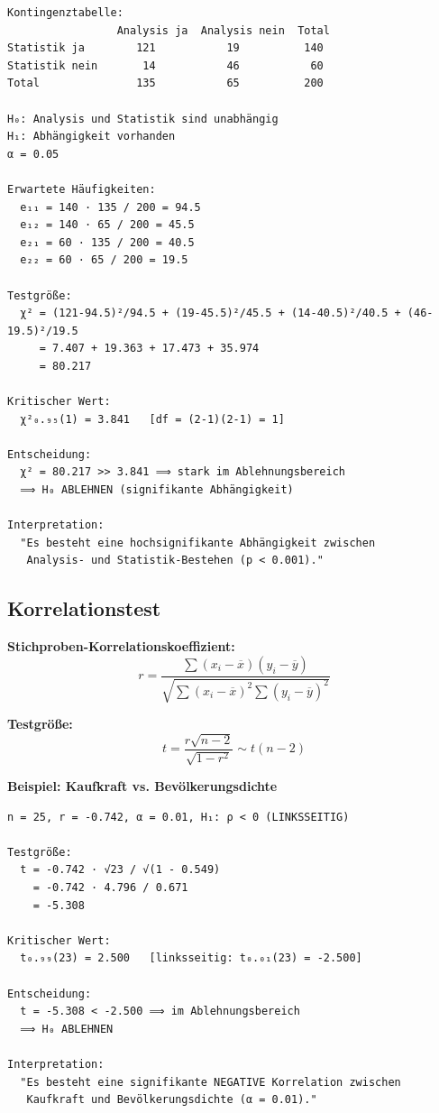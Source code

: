 \documentclass[12pt, a4paper, ngerman]{scrartcl}
\begin{document}
\begin{verbatim}
Kontingenztabelle:
                 Analysis ja  Analysis nein  Total
Statistik ja        121           19          140
Statistik nein       14           46           60
Total               135           65          200

H₀: Analysis und Statistik sind unabhängig
H₁: Abhängigkeit vorhanden
α = 0.05

Erwartete Häufigkeiten:
  e₁₁ = 140 · 135 / 200 = 94.5
  e₁₂ = 140 · 65 / 200 = 45.5
  e₂₁ = 60 · 135 / 200 = 40.5
  e₂₂ = 60 · 65 / 200 = 19.5

Testgröße:
  χ² = (121-94.5)²/94.5 + (19-45.5)²/45.5 + (14-40.5)²/40.5 + (46-19.5)²/19.5
     = 7.407 + 19.363 + 17.473 + 35.974
     = 80.217

Kritischer Wert:
  χ²₀.₉₅(1) = 3.841   [df = (2-1)(2-1) = 1]

Entscheidung:
  χ² = 80.217 >> 3.841 ⟹ stark im Ablehnungsbereich
  ⟹ H₀ ABLEHNEN (signifikante Abhängigkeit)

Interpretation:
  "Es besteht eine hochsignifikante Abhängigkeit zwischen
   Analysis- und Statistik-Bestehen (p < 0.001)."
\end{verbatim}

\subsection{Korrelationstest}

\textbf{Stichproben-Korrelationskoeffizient:}
$$r = \frac{\sum(x_i - \overline{x})(y_i - \overline{y})}{\sqrt{\sum(x_i - \overline{x})^2 \sum(y_i - \overline{y})^2}}$$

\textbf{Testgröße:}
$$t = \frac{r\sqrt{n-2}}{\sqrt{1-r^2}} \sim t(n-2)$$

\textbf{Beispiel: Kaufkraft vs. Bevölkerungsdichte}

\begin{verbatim}
n = 25, r = -0.742, α = 0.01, H₁: ρ < 0 (LINKSSEITIG)

Testgröße:
  t = -0.742 · √23 / √(1 - 0.549)
    = -0.742 · 4.796 / 0.671
    = -5.308

Kritischer Wert:
  t₀.₉₉(23) = 2.500   [linksseitig: t₀.₀₁(23) = -2.500]

Entscheidung:
  t = -5.308 < -2.500 ⟹ im Ablehnungsbereich
  ⟹ H₀ ABLEHNEN

Interpretation:
  "Es besteht eine signifikante NEGATIVE Korrelation zwischen
   Kaufkraft und Bevölkerungsdichte (α = 0.01)."
\end{verbatim}
\end{document}
